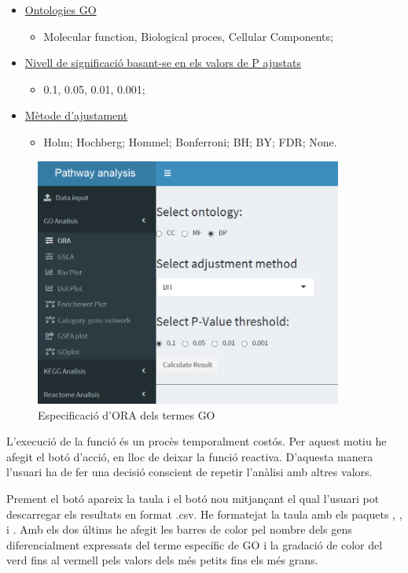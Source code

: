 \documentclass[]{article}
\begin{document}
\begin{itemize}
\item \underline{Ontologies GO} 
\begin{itemize}
\item Molecular function, Biological proces, Cellular Components;
\end{itemize}
\item \underline{Nivell de significació basant-se en els valors de P ajustats}
\begin{itemize}
\item 0.1, 0.05, 0.01, 0.001;
\end{itemize}
\item \underline{Mètode d'ajustament}
\begin{itemize}
\item Holm; Hochberg; Hommel; Bonferroni; BH; BY; FDR; None.
\end{itemize}
\end{itemize}

\begin{figure}[h!]
\includegraphics[width=0.9\textwidth]{App_F5_Items_GO_ORA.png}
\caption{Especificació d'ORA dels termes GO}
\end{figure}
L'execució de la funció és un procès temporalment costós. Per aquest motiu he afegit el botó d'acció, en lloc de deixar la funció reactiva. D'aquesta manera l'usuari ha de fer una decisió conscient de repetir l'anàlisi amb altres valors.

Prement el botó apareix la taula i el botó nou mitjançant el qual l'usuari pot descarregar els resultats en format .csv. He formatejat la taula amb els paquets , ,  i . Amb els dos últims he afegit les barres de color pel nombre dels gens diferencialment expressats del terme específic de GO i la gradació de color del verd fins al vermell pels valors dels més petits fins els més grans. 
\end{document}
